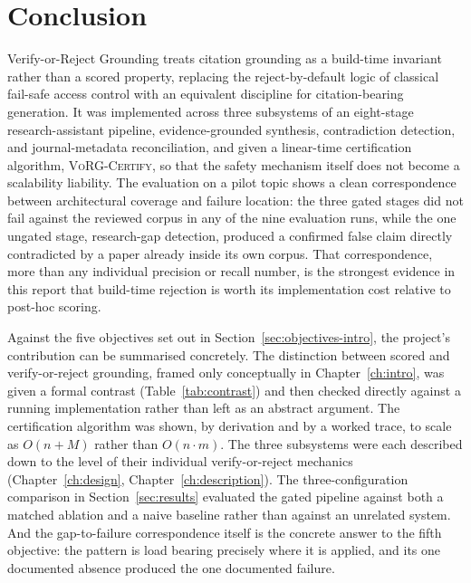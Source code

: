 \documentclass[12pt,a4paper]{report}
\begin{document}
\section{Conclusion}
Verify-or-Reject Grounding treats citation grounding as a build-time invariant
rather than a scored property, replacing the reject-by-default logic of
classical fail-safe access control with an equivalent discipline for
citation-bearing generation. It was implemented across three subsystems of an
eight-stage research-assistant pipeline, evidence-grounded synthesis,
contradiction detection, and journal-metadata reconciliation, and given a
linear-time certification algorithm, \textsc{VoRG-Certify}, so that the safety
mechanism itself does not become a scalability liability. The evaluation on a
pilot topic shows a clean correspondence between architectural coverage and
failure location: the three gated stages did not fail against the reviewed
corpus in any of the nine evaluation runs, while the one ungated stage,
research-gap detection, produced a confirmed false claim directly contradicted
by a paper already inside its own corpus. That correspondence, more than any
individual precision or recall number, is the strongest evidence in this
report that build-time rejection is worth its implementation cost relative to
post-hoc scoring.

Against the five objectives set out in Section~\ref{sec:objectives-intro},
the project's contribution can be summarised concretely. The distinction
between scored and verify-or-reject grounding, framed only conceptually in
Chapter~\ref{ch:intro}, was given a formal contrast (Table~\ref{tab:contrast})
and then checked directly against a running implementation rather than left
as an abstract argument. The certification algorithm was shown, by
derivation and by a worked trace, to scale as $O(n+M)$ rather than
$O(n \cdot m)$. The three subsystems were each described down to the level of
their individual verify-or-reject mechanics (Chapter~\ref{ch:design},
Chapter~\ref{ch:description}). The three-configuration comparison in
Section~\ref{sec:results} evaluated the gated pipeline against both a matched
ablation and a naive baseline rather than against an unrelated system. And the
gap-to-failure correspondence itself is the concrete answer to the fifth
objective: the pattern is load bearing precisely where it is applied, and its
one documented absence produced the one documented failure.
\end{document}
